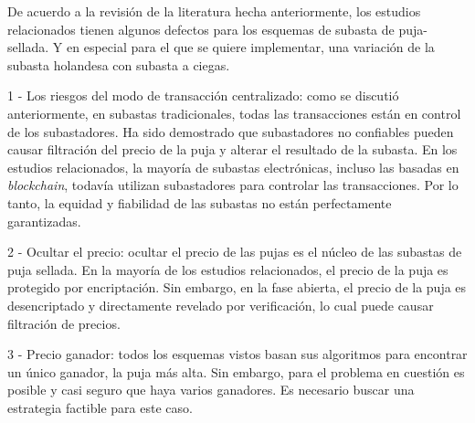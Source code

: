 


    De acuerdo a la revisión de la literatura hecha anteriormente, los estudios relacionados tienen algunos defectos para los 
    esquemas de subasta de puja-sellada. Y en especial para el que se quiere implementar, una variación de la subasta holandesa con 
    subasta a ciegas.

    1 - Los riesgos del modo de transacción centralizado: como se discutió anteriormente, en subastas tradicionales, todas las transacciones
    están en control de los subastadores. Ha sido demostrado que subastadores no confiables pueden causar filtración del precio de la puja
    y alterar el resultado de la subasta. En los estudios relacionados, la mayoría de subastas electrónicas, incluso las basadas en 
    \textit{blockchain}, todavía utilizan subastadores para controlar las transacciones. Por lo tanto, la equidad y fiabilidad de las 
    subastas no están perfectamente garantizadas.

    2 - Ocultar el precio: ocultar el precio de las pujas es el núcleo de las subastas de puja sellada. En la mayoría de los estudios 
    relacionados, el precio de la puja es protegido por encriptación. Sin embargo, en la fase abierta, el precio de la puja es desencriptado
    y directamente revelado por verificación, lo cual puede causar filtración de precios.

    3 - Precio ganador: todos los esquemas vistos basan sus algoritmos para encontrar un único ganador, la puja más alta. Sin embargo, para
    el problema en cuestión es posible y casi seguro que haya varios ganadores. Es necesario buscar una estrategia factible para este caso.
    
